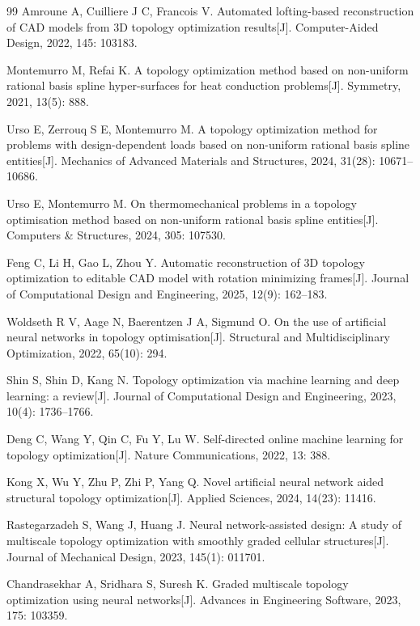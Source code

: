 \documentclass{FRB-style}
\begin{document}
\begin{thebibliography}{99}
Amroune A, Cuilliere J C, Francois V. Automated lofting-based reconstruction of CAD models from 3D topology optimization results[J]. Computer-Aided Design, 2022, 145: 103183.

Montemurro M, Refai K. A topology optimization method based on non-uniform rational basis spline hyper-surfaces for heat conduction problems[J]. Symmetry, 2021, 13(5): 888.

Urso E, Zerrouq S E, Montemurro M. A topology optimization method for problems with design-dependent loads based on non-uniform rational basis spline entities[J]. Mechanics of Advanced Materials and Structures, 2024, 31(28): 10671--10686.

Urso E, Montemurro M. On thermomechanical problems in a topology optimisation method based on non-uniform rational basis spline entities[J]. Computers \& Structures, 2024, 305: 107530.

Feng C, Li H, Gao L, Zhou Y. Automatic reconstruction of 3D topology optimization to editable CAD model with rotation minimizing frames[J]. Journal of Computational Design and Engineering, 2025, 12(9): 162--183.

Woldseth R V, Aage N, Baerentzen J A, Sigmund O. On the use of artificial neural networks in topology optimisation[J]. Structural and Multidisciplinary Optimization, 2022, 65(10): 294.

Shin S, Shin D, Kang N. Topology optimization via machine learning and deep learning: a review[J]. Journal of Computational Design and Engineering, 2023, 10(4): 1736--1766.

Deng C, Wang Y, Qin C, Fu Y, Lu W. Self-directed online machine learning for topology optimization[J]. Nature Communications, 2022, 13: 388.

Kong X, Wu Y, Zhu P, Zhi P, Yang Q. Novel artificial neural network aided structural topology optimization[J]. Applied Sciences, 2024, 14(23): 11416.

Rastegarzadeh S, Wang J, Huang J. Neural network-assisted design: A study of multiscale topology optimization with smoothly graded cellular structures[J]. Journal of Mechanical Design, 2023, 145(1): 011701.

Chandrasekhar A, Sridhara S, Suresh K. Graded multiscale topology optimization using neural networks[J]. Advances in Engineering Software, 2023, 175: 103359.


\end{thebibliography}
\end{document}

